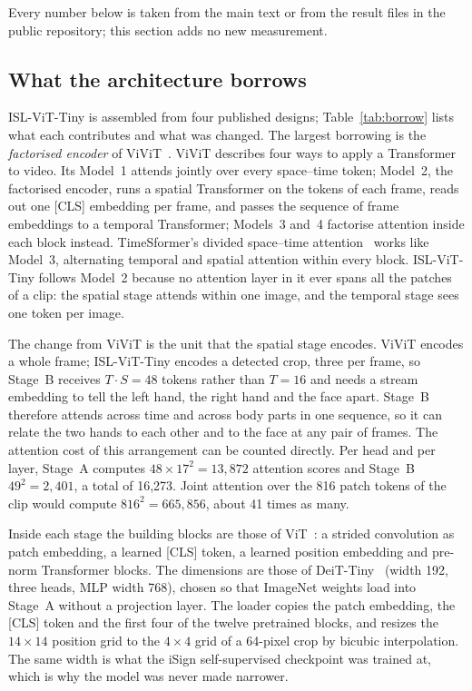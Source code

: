 \documentclass[pdflatex,sn-mathphys-num,onecolumn]{sn-jnl}
\theoremstyle{thmstyleone}%
\begin{document}
Every number below is taken from the main text or from the result files in the public repository; this section adds no new measurement.

\subsection{What the architecture borrows}

ISL-ViT-Tiny is assembled from four published designs; Table~\ref{tab:borrow} lists what each contributes and what was changed. The largest borrowing is the \emph{factorised encoder} of ViViT~\cite{arnab2021vivit}. ViViT describes four ways to apply a Transformer to video. Its Model~1 attends jointly over every space--time token; Model~2, the factorised encoder, runs a spatial Transformer on the tokens of each frame, reads out one [CLS] embedding per frame, and passes the sequence of frame embeddings to a temporal Transformer; Models~3 and~4 factorise attention inside each block instead. TimeSformer's divided space--time attention~\cite{bertasius2021timesformer} works like Model~3, alternating temporal and spatial attention within every block. ISL-ViT-Tiny follows Model~2 because no attention layer in it ever spans all the patches of a clip: the spatial stage attends within one image, and the temporal stage sees one token per image.

The change from ViViT is the unit that the spatial stage encodes. ViViT encodes a whole frame; ISL-ViT-Tiny encodes a detected crop, three per frame, so Stage~B receives $T\cdot S=48$ tokens rather than $T=16$ and needs a stream embedding to tell the left hand, the right hand and the face apart. Stage~B therefore attends across time and across body parts in one sequence, so it can relate the two hands to each other and to the face at any pair of frames. The attention cost of this arrangement can be counted directly. Per head and per layer, Stage~A computes $48\times17^2=13{,}872$ attention scores and Stage~B $49^2=2{,}401$, a total of 16,273. Joint attention over the 816 patch tokens of the clip would compute $816^2=665{,}856$, about 41 times as many.

Inside each stage the building blocks are those of ViT~\cite{dosovitskiy2021vit}: a strided convolution as patch embedding, a learned [CLS] token, a learned position embedding and pre-norm Transformer blocks. The dimensions are those of DeiT-Tiny~\cite{touvron2021deit} (width 192, three heads, MLP width 768), chosen so that ImageNet weights load into Stage~A without a projection layer. The loader copies the patch embedding, the [CLS] token and the first four of the twelve pretrained blocks, and resizes the $14\times14$ position grid to the $4\times4$ grid of a 64-pixel crop by bicubic interpolation. The same width is what the iSign self-supervised checkpoint was trained at, which is why the model was never made narrower.
\end{document}
